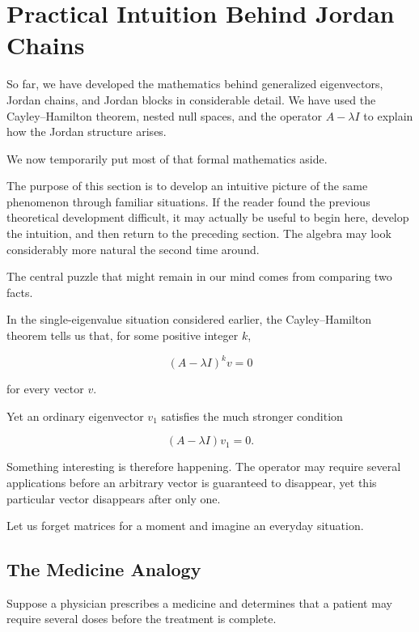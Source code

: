 \documentclass[11pt]{article}
\begin{document}
\section{Practical Intuition Behind Jordan Chains}

So far, we have developed the mathematics behind generalized
eigenvectors, Jordan chains, and Jordan blocks in considerable detail.
We have used the Cayley--Hamilton theorem, nested null spaces, and the
operator \(A-\lambda I\) to explain how the Jordan structure arises.

We now temporarily put most of that formal mathematics aside.

The purpose of this section is to develop an intuitive picture of the
same phenomenon through familiar situations.  If the reader found the
previous theoretical development difficult, it may actually be useful
to begin here, develop the intuition, and then return to the preceding
section.  The algebra may look considerably more natural the second
time around.

The central puzzle that might remain in our mind comes from comparing
two facts.

In the single-eigenvalue situation considered earlier, the
Cayley--Hamilton theorem tells us that, for some positive integer \(k\),

\[
\boxed{
(A-\lambda I)^k v=0
}
\]

for every vector \(v\).

Yet an ordinary eigenvector \(v_1\) satisfies the much stronger
condition

\[
\boxed{
(A-\lambda I)v_1=0.
}
\]

Something interesting is therefore happening.  The operator may require
several applications before an arbitrary vector is guaranteed to
disappear, yet this particular vector disappears after only one.

Let us forget matrices for a moment and imagine an everyday situation.

\subsection{The Medicine Analogy}

Suppose a physician prescribes a medicine and determines that a patient
may require several doses before the treatment is complete.
\end{document}
